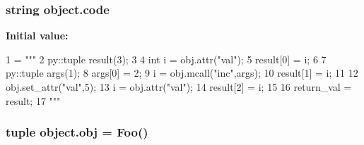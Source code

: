 \subsubsection[{code}]{\setlength{\rightskip}{0pt plus 5cm}string object.\+code}\label{namespaceobject_a9e209a145a833747e51712b7e234b7e2}
{\bfseries Initial value\+:}
\begin{DoxyCode}
1 = \textcolor{stringliteral}{"""}
2 \textcolor{stringliteral}{       py::tuple result(3);}
3 \textcolor{stringliteral}{}
4 \textcolor{stringliteral}{       int i = obj.attr("val");}
5 \textcolor{stringliteral}{       result[0] = i;}
6 \textcolor{stringliteral}{}
7 \textcolor{stringliteral}{       py::tuple args(1);}
8 \textcolor{stringliteral}{       args[0] = 2;}
9 \textcolor{stringliteral}{       i = obj.mcall("inc",args);}
10 \textcolor{stringliteral}{       result[1] = i;}
11 \textcolor{stringliteral}{}
12 \textcolor{stringliteral}{       obj.set\_attr("val",5);}
13 \textcolor{stringliteral}{       i = obj.attr("val");}
14 \textcolor{stringliteral}{       result[2] = i;}
15 \textcolor{stringliteral}{}
16 \textcolor{stringliteral}{       return\_val = result;}
17 \textcolor{stringliteral}{       """}
\end{DoxyCode}
\hypertarget{namespaceobject_a25711dde7eabb29a638a5a93177fe5c5}{}
\subsubsection[{obj}]{\setlength{\rightskip}{0pt plus 5cm}tuple object.\+obj = {\bf Foo}()}\label{namespaceobject_a25711dde7eabb29a638a5a93177fe5c5}
